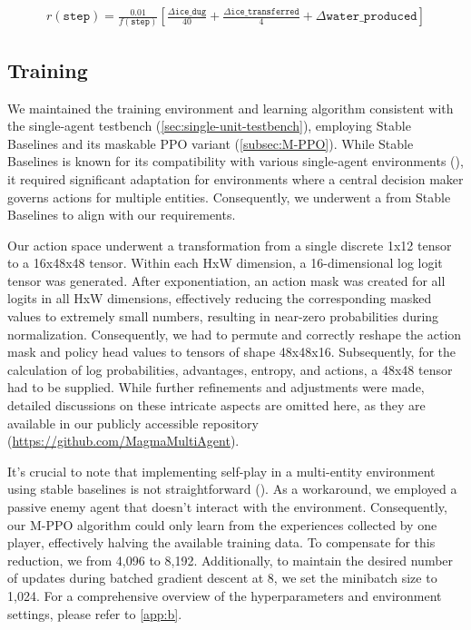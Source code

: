 \begin{align}
    r(\texttt{step}) = \frac{0.01}{f(\texttt{step})} \left[ 
    \frac{\Delta \texttt{ice\_dug}}{40} 
    + \frac{\Delta \texttt{ice\_transferred}}{4} 
    + \Delta \texttt{water\_produced}
    \right]
    \label{eq:reward-mono}
\end{align}

\subsection{Training}
\label{sec:monolithic-approach-training}

\noindent We maintained the training environment and learning algorithm consistent with the single-agent testbench (\autoref{sec:single-unit-testbench}), employing Stable Baselines and its maskable PPO variant (\autoref{subsec:M-PPO}). While Stable Baselines is known for its compatibility with various single-agent environments (\cite{stable-baselines3}), it required significant adaptation for environments where a central decision maker governs actions for multiple entities. Consequently, we underwent a  from Stable Baselines to align with our requirements.

\bigskip

\noindent Our action space underwent a transformation from a single discrete 1x12 tensor to a  16x48x48 tensor. Within each HxW dimension, a 16-dimensional log logit tensor was generated. After exponentiation, an action mask was created for all logits in all HxW dimensions, effectively reducing the corresponding masked values to extremely small numbers, resulting in near-zero probabilities during normalization. Consequently, we had to permute and correctly reshape the action mask and policy head values to tensors of shape 48x48x16. Subsequently, for the calculation of log probabilities, advantages, entropy, and actions, a 48x48 tensor had to be supplied. While further refinements and adjustments were made, detailed discussions on these intricate aspects are omitted here, as they are available in our publicly accessible repository (\url{https://github.com/MagmaMultiAgent}).

\bigskip

\noindent It's crucial to note that implementing self-play in a multi-entity environment using stable baselines is not straightforward (\cite{stable-baselines-issue181}). As a workaround, we employed a passive enemy agent that doesn't interact with the environment. Consequently, our M-PPO algorithm could only learn from the experiences collected by one player, effectively halving the available training data. To compensate for this reduction, we  from 4,096 to 8,192. Additionally, to maintain the desired number of updates during batched gradient descent at 8, we set the minibatch size to 1,024. For a comprehensive overview of the hyperparameters and environment settings, please refer to \autoref{app:b}. 


